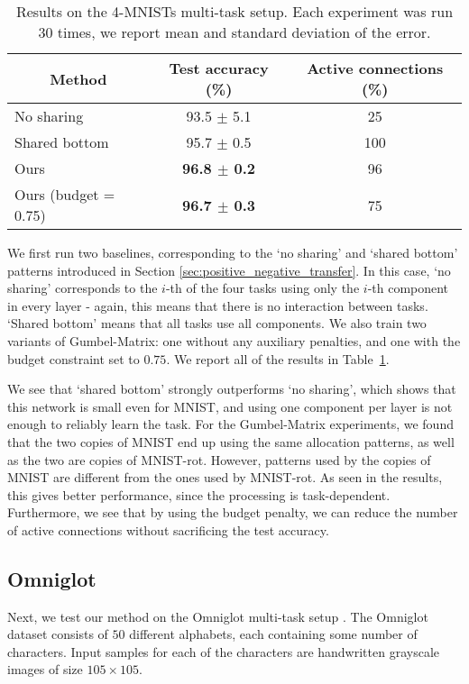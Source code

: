 \documentclass[conference]{IEEEtran}
\begin{document}
\begin{table}[t]
\caption{Results on the 4-MNISTs multi-task setup. Each experiment was run $30$ times, we report mean and standard deviation of the error.}
\label{tab:mnist}
\begin{center}
\begin{tabular}{lcc}
\toprule
\multicolumn{1}{c}{\bf Method}  &\multicolumn{1}{c}{\bf Test accuracy (\%)} &\multicolumn{1}{c}{\bf Active connections (\%)} \\
\midrule
No sharing                      & 93.5 $\pm$ 5.1          & 25      \\
Shared bottom                    & 95.7 $\pm$ 0.5          & 100     \\
\midrule
Ours                   & \bf{96.8 $\pm$ 0.2}     & 96      \\
Ours (budget = 0.75)   & \bf{96.7 $\pm$ 0.3}     & 75      \\
\bottomrule
\end{tabular}
\end{center}
\end{table}

We first run two baselines, corresponding to the `no sharing' and `shared bottom' patterns introduced in Section \ref{sec:positive_negative_transfer}. In this case, `no sharing' corresponds to the $i$-th of the four tasks using only the $i$-th component in every layer - again, this means that there is no interaction between tasks. `Shared bottom' means that all tasks use all components. We also train two variants of Gumbel-Matrix: one without any auxiliary penalties, and one with the budget constraint set to $0.75$.
We report all of the results in Table~\ref{tab:mnist}.

We see that `shared bottom' strongly outperforms `no sharing', which shows that this network is small even for MNIST, and using one component per layer is not enough to reliably learn the task.
For the Gumbel-Matrix experiments, we found that the two copies of MNIST end up using the same allocation patterns, as well as the two are copies of MNIST-rot. However, patterns used by the copies of MNIST are different from the ones used by MNIST-rot. As seen in the results, this gives better performance, since the processing is task-dependent. Furthermore, we see that by using the budget penalty, we can reduce the number of active connections without sacrificing the test accuracy.

\subsection{Omniglot}\label{subsec:omniglot}
Next, we test our method on the Omniglot multi-task setup \cite{OmniglotMT-2015}.
The Omniglot dataset consists of $50$ different alphabets, each containing some number of characters. Input samples for each of the characters are handwritten grayscale images of size $105 \times 105$.
\end{document}
